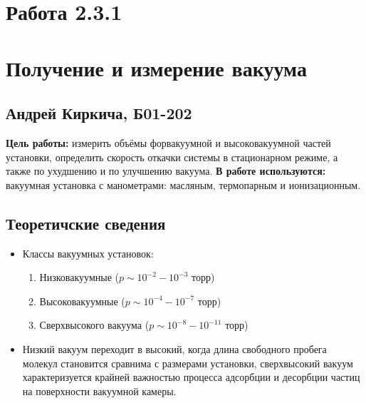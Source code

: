 


	\section*{Работа 2.3.1}	
	\section*{Получение и измерение вакуума}
	\subsection*{Андрей Киркича, Б01-202}
	\n
	\textbf{Цель работы: }
измерить объёмы форвакуумной и высоковакуумной частей установки, определить скорость откачки системы в стационарном режиме, а также по ухудшению и по улучшению вакуума.
	\n\n
	\textbf{В работе используются: }
вакуумная установка с манометрами: масляным, термопарным и ионизационным.
	\n\n
	\subsection*{Теоретичские сведения}
	\begin{itemize}
	\item Классы вакуумных установок:
	\begin{enumerate}
	\item Низковакуумные ($p \sim 10^{-2} - 10^{-3}$ торр)
	\item Высоковакуумные ($p \sim 10^{-4} - 10^{-7}$ торр)
	\item Сверхвысокого вакуума ($p \sim 10^{-8} - 10^{-11}$ торр)
	\end{enumerate}
	\item Низкий вакуум переходит в высокий, когда длина свободного пробега молекул становится сравнима с размерами установки, сверхвысокий вакуум характеризуется крайней важностью процесса адсорбции и десорбции частиц на поверхности вакуумной камеры.
	\end{itemize}
